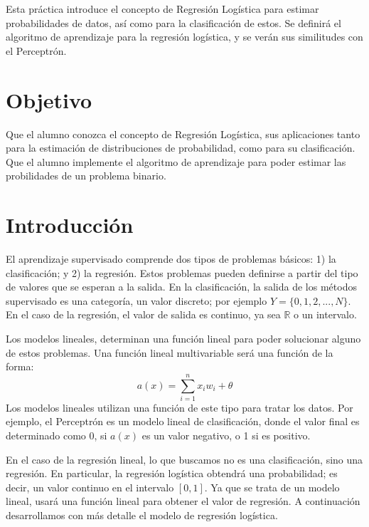 
Esta práctica introduce el concepto de Regresión Logística para estimar probabilidades de datos, así como para la clasificación de estos. Se definirá el algoritmo de aprendizaje para la regresión logística, y se verán sus similitudes con el Perceptrón.


\section{Objetivo}

Que el alumno conozca el concepto de Regresión Logística, sus aplicaciones tanto para la estimación de distribuciones de probabilidad, como para su clasificación. Que el alumno implemente el algoritmo de aprendizaje para poder estimar las probilidades de un problema binario.

\section{Introducción}

El aprendizaje supervisado comprende dos tipos de problemas básicos: 1) la clasificación; y 2) la regresión. Estos problemas pueden definirse a partir del tipo de valores que se esperan a la salida. En la clasificación, la salida de los métodos supervisado es una categoría, un valor discreto; por ejemplo $Y = \{0,1,2,...,N\}$. En el caso de la regresión, el valor de salida es continuo, ya sea $\mathbb{R}$ o un intervalo. 

Los modelos lineales, determinan una función lineal para poder solucionar alguno de estos problemas. Una función lineal multivariable será una función de la forma: $$a(x) = \sum_{i=1}^n x_iw_i + \theta$$
Los modelos lineales utilizan una función de este tipo para tratar los datos. Por ejemplo, el Perceptrón es un modelo lineal de clasificación, donde el valor final es determinado como 0, si $a(x)$ es un valor negativo, o 1 si es positivo.

En el caso de la regresión lineal, lo que buscamos no es una clasificación, sino una regresión. En particular, la regresión logística obtendrá una probabilidad; es decir, un valor continuo en el intervalo $[0,1]$. Ya que se trata de un modelo lineal, usará una función lineal para obtener el valor de regresión. A continuación desarrollamos con más detalle el modelo de regresión logística.  

